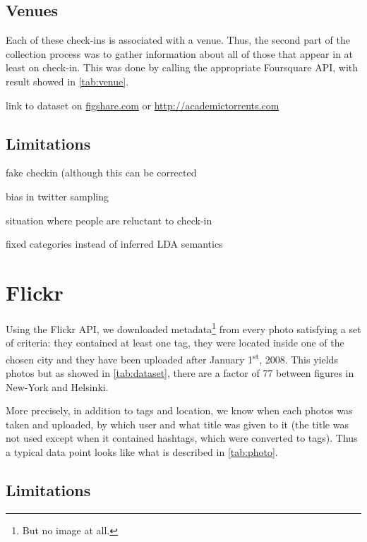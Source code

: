 \subsection{Venues}

Each of these check-ins is associated with a venue. Thus, the second part of
the collection process was to gather information about all of those
 that appear in at least on check-in. This was done by calling the
appropriate Foursquare API, with result showed in \autoref{tab:venue}.

link to dataset on
\href{http://figshare.com/authors/G\%C3\%A9raud\%20Le\%20Falher/542931}%
{\url{figshare.com}} or \url{http://academictorrents.com}

\subsection{Limitations}

fake checkin\autocite{FakeCheckins12} (although this can be corrected
\autocite{ValidateCheckin13,FindingFake14}

bias in twitter sampling\autocite{TwitterBias14}

situation where people are reluctant to check-in\autocite{Privacy11}

fixed categories instead of inferred LDA semantics\autocite{PlaceSemantic14}

\section{Flickr}

Using the Flickr API, we downloaded metadata\footnote{But no image at all.}
from every photo satisfying a set of criteria: they contained at least one
tag, they were located inside one of the chosen city and they have been
uploaded after January 1\textsuperscript{st}, 2008. This yields
 photos but as showed in \autoref{tab:dataset}, there are a
factor of 77 between figures in New-York and Helsinki.

More precisely, in addition to tags and location, we know when each photos was
taken and uploaded, by which user and what title was given to it (the title
was not used except when it contained hashtags, which were converted to tags).
Thus a typical data point looks like what is described in \autoref{tab:photo}.

\subsection{Limitations}

